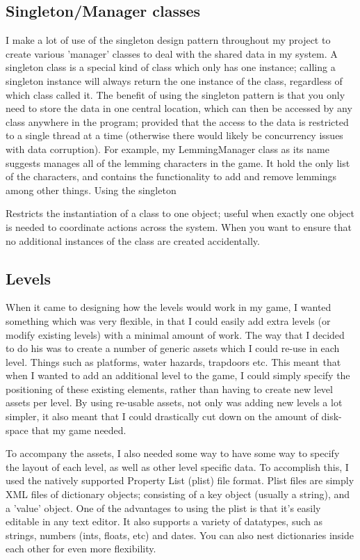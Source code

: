 \documentclass[a4paper,oneside]{report}
\begin{document}
\subsection{Singleton/Manager classes} I make a lot of use of the singleton design pattern throughout my project to create various 'manager' classes to deal with the shared data in my system. A singleton class is a special kind of class which only has one instance; calling a singleton instance will always return the one instance of the class, regardless of which class called it. The benefit of using the singleton pattern is that you only need to store the data in one central location, which can then be accessed by any class anywhere in the program; provided that the access to the data is restricted to a single thread at a time (otherwise there would likely be concurrency issues with data corruption). For example, my LemmingManager class as its name suggests manages all of the lemming characters in the game. It hold the only list of the characters, and contains the functionality to add and remove lemmings among other things. Using the singleton 

Restricts the instantiation of a class to one object; useful when exactly one object is needed to coordinate actions across the system. When you want to ensure that no additional instances of the class are created accidentally.

\subsection{Levels} When it came to designing how the levels would work in my game, I wanted something which was very flexible, in that I could easily add extra levels (or modify existing levels) with a minimal amount of work. The way that I decided to do his was to create a number of generic assets which I could re-use in each level. Things such as platforms, water hazards, trapdoors etc. This meant that when I wanted to add an additional level to the game, I could simply specify the positioning of these existing elements, rather than having to create new level assets per level. By using re-usable assets, not only was adding new levels a lot simpler, it also meant that I could drastically cut down on the amount of disk-space that my game needed.

To accompany the assets, I also needed some way to have some way to specify the layout of each level, as well as other level specific data. To accomplish this, I used the natively supported Property List (plist) file format. Plist files are simply XML files of dictionary objects; consisting of a key object (usually a string), and a 'value' object. One of the advantages to using the plist is that it's easily editable in any text editor. It also supports a variety of datatypes, such as strings, numbers (ints, floats, etc) and dates. You can also nest dictionaries inside each other for even more flexibility. 
\end{document}
